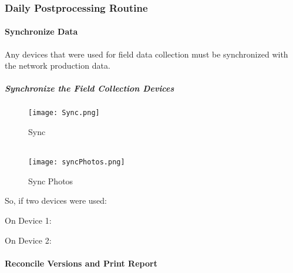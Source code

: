 \subsubsection{Daily Postprocessing Routine}
\paragraph{Synchronize Data}

Any devices that were used for field data collection must be synchronized with the network production data.

\vspace{.5in}

\subparagraph{Synchronize the Field Collection Devices}

\begin{wrapfigure}{r}{0.5\textwidth}
\centering
    \texttt{[image: Sync.png]}
\caption{Sync}
\vspace{.05in}

\HRule \\[.4cm] %
\vspace{.05in}
    \texttt{[image: syncPhotos.png]}
\caption{Sync Photos}

\end{wrapfigure}
So, if two devices were used:

\vspace{.5in}

\noindent On Device 1:

\vspace{.75in}


\vspace{1.75in}

\noindent On Device 2:

\vspace{.75in}


\clearpage

\paragraph{Reconcile Versions and Print Report}

\vspace{.5in}

